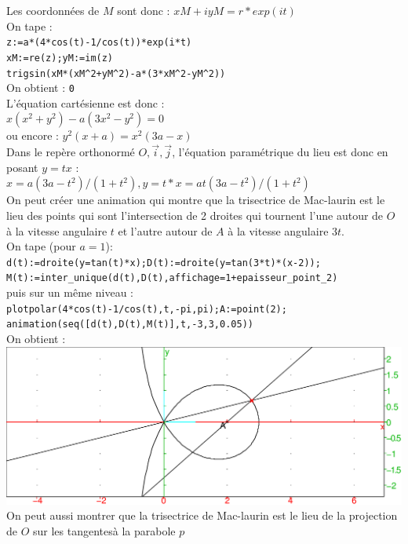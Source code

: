 \documentclass[a4paper,11pt]{book}
\begin{document}
Les coordonn\'ees de $M$ sont donc :
$xM+iyM=r*exp(it)$\\
On tape :\\
{\tt z:=a*(4*cos(t)-1/cos(t))*exp(i*t)}\\
{\tt xM:=re(z);yM:=im(z) }\\
{\tt trigsin(xM*(xM\verb|^|2+yM\verb|^|2)-a*(3*xM\verb|^|2-yM\verb|^|2))}\\
On obtient : {\tt 0}\\
L'\'equation cart\'esienne est donc :\\
$x(x^2+y^2)-a(3x^2-y^2)=0$\\
ou encore :
$y^2(x+a)=x^2(3a-x)$\\
Dans le rep\`ere orthonorm\'e $O,\overrightarrow i,\overrightarrow j$, 
l'\'equation param\'etrique du lieu est donc en posant $y=tx$ :\\
$x=a(3a-t^2)/(1+t^2),y=t*x=at(3a-t^2)/(1+t^2)$\\
On peut cr\'eer une animation qui montre que la trisectrice de Mac-laurin est 
le lieu des points qui sont l'intersection de 2 droites qui tournent l'une 
autour de $O$ \`a la vitesse angulaire $t$ et l'autre autour de $A$ \`a la 
vitesse angulaire $3t$.\\
On tape (pour $a=1$):\\
{\tt d(t):=droite(y=tan(t)*x);D(t):=droite(y=tan(3*t)*(x-2));}\\
{\tt M(t):=inter\_unique(d(t),D(t),affichage=1+epaisseur\_point\_2)}\\
puis sur un m\^eme niveau :\\
{\tt plotpolar(4*cos(t)-1/cos(t),t,-pi,pi);A:=point(2);}\\
{\tt animation(seq([d(t),D(t),M(t)],t,-3,3,0.05))}\\
On obtient :\\
\includegraphics[width=\textwidth]{trisect2}\\
On peut aussi montrer que la trisectrice de Mac-laurin est 
le lieu de la projection de $O$ sur les tangentes\`a la parabole $p$ 
\end{document}
